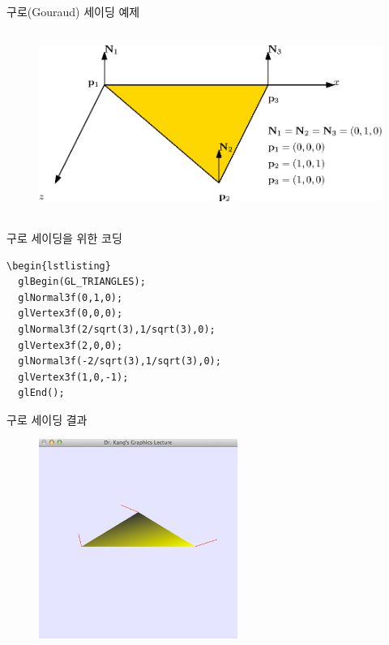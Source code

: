 \documentclass{beamer}
\begin{document}
\begin{frame}[fragile]{구로(Gouraud) 세이딩 예제}

\begin{figure}[h!]
  \centering
    \includegraphics[height=6cm]{OGL_light/simpleTriangle.eps}
\end{figure}

\end{frame}

\begin{frame}[fragile]{구로 세이딩을 위한 코딩}

\lstset{language=C++, escapechar=^} 
\begin{lstlisting}
\begin{lstlisting}
  glBegin(GL_TRIANGLES);
  glNormal3f(0,1,0);
  glVertex3f(0,0,0);
  glNormal3f(2/sqrt(3),1/sqrt(3),0);
  glVertex3f(2,0,0);
  glNormal3f(-2/sqrt(3),1/sqrt(3),0);
  glVertex3f(1,0,-1);
  glEnd();
\end{lstlisting}

\end{frame}


\begin{frame}[fragile]{구로 세이딩 결과}

\begin{figure}[h!]
  \centering
    \includegraphics[height=6.5cm]{OGL_light/normalSetting.png}
\end{figure}

\end{frame}
\end{document}
